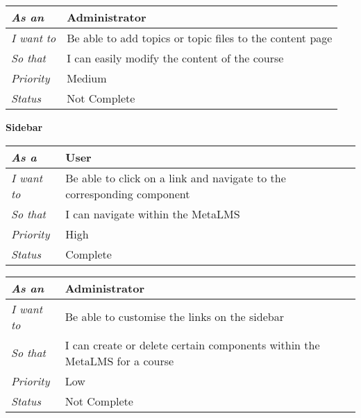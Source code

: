 \begin{table}[h!]
    \begin{tabular}{|l|l|}
        \hline
        \textit{As an} & Administrator \\ \hline
        \textit{I want to} & Be able to add topics or topic files to the content page \\ \hline
        \textit{So that} & I can easily modify the content of the course \\ \hline
        \textit{Priority} & {\color[HTML]{FE996B} Medium} \\ \hline
        \textit{Status} & Not Complete \\ \hline
    \end{tabular}
\end{table}

\pagebreak
\FloatBarrier
\textbf{Sidebar}
\FloatBarrier
\begin{table}[h!]
    \begin{tabular}{|l|l|}
        \hline
        \textit{As a} & User \\ \hline
        \textit{I want to} & Be able to click on a link and navigate to the corresponding component \\ \hline
        \textit{So that} & I can navigate within the MetaLMS\\ \hline
        \textit{Priority} & {\color[HTML]{FE0000} High} \\ \hline
        \textit{Status} & Complete \\ \hline
    \end{tabular}
\end{table}

\begin{table}[h!]
    \begin{tabular}{|l|l|}
        \hline
        \textit{As an} & Administrator \\ \hline
        \textit{I want to} & Be able to customise the links on the sidebar \\ \hline
        \textit{So that} & I can create or delete certain components within the MetaLMS for a course\\ \hline
        \textit{Priority} & {\color[HTML]{3166FF} Low} \\ \hline
        \textit{Status} & Not Complete \\ \hline
    \end{tabular}
\end{table}


